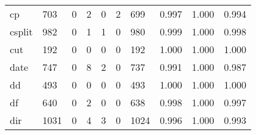 \begin{longtable}{lp{2.0cm}p{2.0cm}p{2.0cm}p{2.0cm}p{2.0cm}p{2.0cm}p{2.0cm}p{2.0cm}p{2.0cm}}
cp        &                    703 &                                  0 &                                 2 &                                0 &                                 2 &                             699 &                                   0.997 &                                  1.000 &                                0.994 \\
csplit    &                    982 &                                  0 &                                 1 &                                1 &                                 0 &                             980 &                                   0.999 &                                  1.000 &                                0.998 \\
cut       &                    192 &                                  0 &                                 0 &                                0 &                                 0 &                             192 &                                   1.000 &                                  1.000 &                                1.000 \\
date      &                    747 &                                  0 &                                 8 &                                2 &                                 0 &                             737 &                                   0.991 &                                  1.000 &                                0.987 \\
dd        &                    493 &                                  0 &                                 0 &                                0 &                                 0 &                             493 &                                   1.000 &                                  1.000 &                                1.000 \\
df        &                    640 &                                  0 &                                 2 &                                0 &                                 0 &                             638 &                                   0.998 &                                  1.000 &                                0.997 \\
dir       &                   1031 &                                  0 &                                 4 &                                3 &                                 0 &                            1024 &                                   0.996 &                                  1.000 &                                0.993 \\

\end{longtable}
